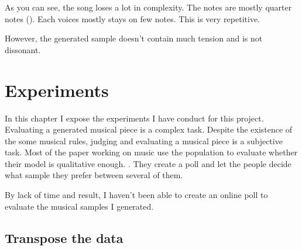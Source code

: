 \documentclass[12pt]{report}
\begin{document}
As you can see, the song loses a lot in complexity.
The notes are mostly quarter notes (\musQuarter).
Each voices mostly stays on few notes.
This is very repetitive.

However, the generated sample doesn't contain much tension and is not dissonant.


\chapter{Experiments}
\label{chap:experiments}







In this chapter I expose the experiments I have conduct for this project.
Evaluating a generated musical piece is a complex task.
Despite the existence of the some musical rules, judging and evaluating a musical piece is a subjective task.
Most of the paper working on music use the population to evaluate whether their model is qualitative enough. \cite{huang_counterpoint_2017, hadjeres_deepbach:_2016, huang_music_2018, liang_automatic_2017, huang_bach_2019}.
They create a poll and let the people decide what sample they prefer between several of them.

By lack of time and result, I haven't been able to create an online poll to evaluate the musical samples I generated.

\section{Transpose the data}
\end{document}

